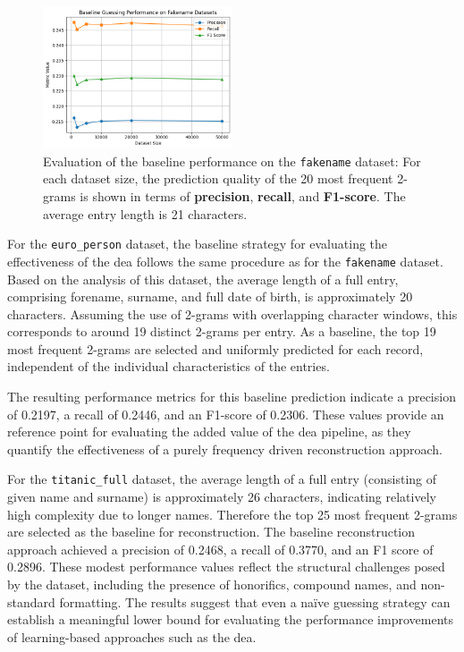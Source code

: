 \begin{figure}[H]
    \centering
    \includegraphics[width=0.5\textwidth]{img/fakename_analysis.png}
    \caption{Evaluation of the baseline performance on the \texttt{fakename} dataset: For each dataset size, the prediction quality of the 20 most frequent 2-grams is shown in terms of \textbf{precision}, \textbf{recall}, and \textbf{F1-score}. The average entry length is 21 characters.}
    \label{fig:baseline_metrics}
\end{figure}

For the \texttt{euro\_person} dataset, the baseline strategy for evaluating the effectiveness of the \ac{dea} follows the same procedure as for the \texttt{fakename} dataset.
Based on the analysis of this dataset, the average length of a full entry, comprising forename, surname, and full date of birth, is approximately 20 characters.
Assuming the use of 2-grams with overlapping character windows, this corresponds to around 19 distinct 2-grams per entry.
As a baseline, the top 19 most frequent 2-grams are selected and uniformly predicted for each record, independent of the individual characteristics of the entries.

The resulting performance metrics for this baseline prediction indicate a precision of 0.2197, a recall of 0.2446, and an F1-score of 0.2306.
These values provide an reference point for evaluating the added value of the \ac{dea} pipeline, as they quantify the effectiveness of a purely frequency driven reconstruction approach.

For the \texttt{titanic\_full} dataset, the average length of a full entry (consisting of given name and surname) is approximately 26 characters, indicating relatively high complexity due to longer names.
Therefore the top 25 most frequent 2-grams are selected as the baseline for reconstruction.
The baseline reconstruction approach achieved a precision of 0.2468, a recall of 0.3770, and an F1 score of 0.2896.
These modest performance values reflect the structural challenges posed by the dataset, including the presence of honorifics, compound names, and non-standard formatting.
The results suggest that even a naïve guessing strategy can establish a meaningful lower bound for evaluating the performance improvements of learning-based approaches such as the \ac{dea}.

